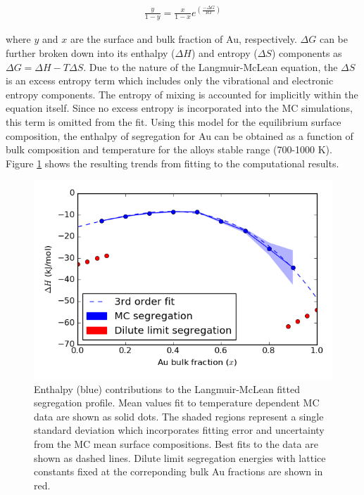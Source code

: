 \documentclass[12pt]{cmuthesis}
\begin{document}
\begin{eqnarray} \label{eq-gibbs}
\frac{y}{1 - y} = \frac{x}{1 - x}e^{\left(\frac{-\Delta G}{RT}\right)}
\end{eqnarray}

\noindent where \(y\) and \(x\) are the surface and bulk fraction of Au, respectively. \(\Delta G\) can be further broken down into its enthalpy (\(\Delta H\)) and entropy (\(\Delta S\)) components as \(\Delta G = \Delta H - T \Delta S\). Due to the nature of the Langmuir-McLean equation, the \(\Delta S\) is an excess entropy term which includes only the vibrational and electronic entropy components. The entropy of mixing is accounted for implicitly within the equation itself. Since no excess entropy is incorporated into the MC simulations, this term is omitted from the fit. Using this model for the equilibrium surface composition, the enthalpy of segregation for Au can be obtained as a function of bulk composition and temperature for the alloys stable range (700-1000 K). Figure \ref{fig-temp-langmuir-mclean} shows the resulting trends from fitting to the computational results.

\begin{figure}[h]
\centering
\includegraphics[width=5in]{./images/temp-langmuir-mclean.png}
\caption{\label{fig-temp-langmuir-mclean}
Enthalpy (blue) contributions to the Langmuir-McLean fitted segregation profile. Mean values fit to temperature dependent MC data are shown as solid dots. The shaded regions represent a single standard deviation which incorporates fitting error and uncertainty from the MC mean surface compositions. Best fits to the data are shown as dashed lines. Dilute limit segregation energies with lattice constants fixed at the correponding bulk Au fractions are shown in red.}
\end{figure}
\end{document}
